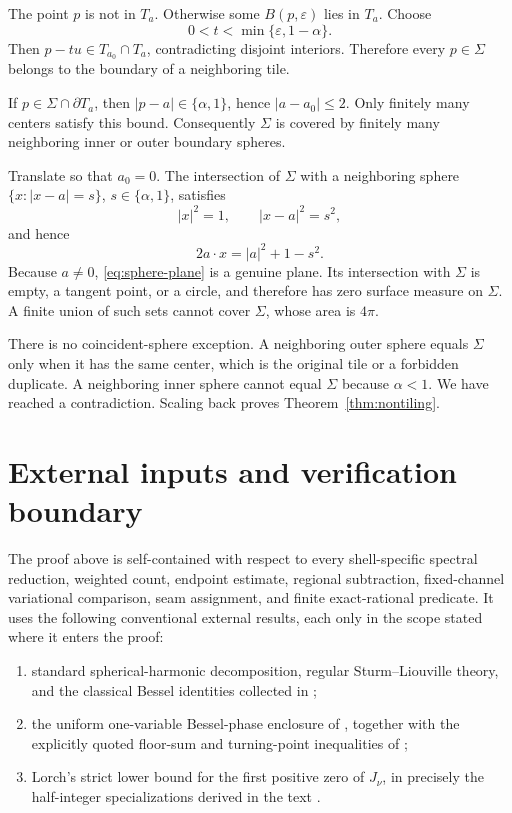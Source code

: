 \documentclass[11pt]{article}
\numberwithin{equation}{section}
\theoremstyle{definition}
\theoremstyle{remark}
\begin{document}
The point \(p\) is not in \(T_a\).  Otherwise some
\(B(p,\varepsilon)\) lies in \(T_a\).  Choose
\[
  0<t<\min\{\varepsilon,1-\alpha\}.
\]
Then \(p-tu\in T_{a_0}\cap T_a\), contradicting disjoint interiors.
Therefore every \(p\in\Sigma\) belongs to the boundary of a neighboring
tile.

If \(p\in\Sigma\cap\partial T_a\), then
\(|p-a|\in\{\alpha,1\}\), hence \(|a-a_0|\le2\).  Only finitely many
centers satisfy this bound.  Consequently \(\Sigma\) is covered by finitely
many neighboring inner or outer boundary spheres.

Translate so that \(a_0=0\).  The intersection of \(\Sigma\) with a
neighboring sphere \(\{x:|x-a|=s\}\), \(s\in\{\alpha,1\}\), satisfies
\[
  |x|^2=1,
  \qquad |x-a|^2=s^2,
\]
and hence
\begin{equation}
  2a\cdot x=|a|^2+1-s^2.
  \label{eq:sphere-plane}
\end{equation}
Because \(a\ne0\), \eqref{eq:sphere-plane} is a genuine plane.  Its
intersection with \(\Sigma\) is empty, a tangent point, or a circle, and
therefore has zero surface measure on \(\Sigma\).  A finite union of such
sets cannot cover \(\Sigma\), whose area is \(4\pi\).

There is no coincident-sphere exception.  A neighboring outer sphere equals
\(\Sigma\) only when it has the same center, which is the original tile or a
forbidden duplicate.  A neighboring inner sphere cannot equal \(\Sigma\)
because \(\alpha<1\).  We have reached a contradiction.  Scaling back proves
Theorem~\ref{thm:nontiling}.

\appendix

\section{External inputs and verification boundary}
\label{app:external-boundary}

The proof above is self-contained with respect to every shell-specific
spectral reduction, weighted count, endpoint estimate, regional subtraction,
fixed-channel variational comparison, seam assignment, and finite
exact-rational predicate.  It uses the following conventional external results, each only
in the scope stated where it enters the proof:
\begin{enumerate}
  \item standard spherical-harmonic decomposition, regular
        Sturm--Liouville theory, and the classical Bessel identities collected
        in \cite{DLMF};
  \item the uniform one-variable Bessel-phase enclosure of
        \cite{FLPSphase}, together with the explicitly quoted floor-sum and
        turning-point inequalities of \cite{FLPSballs,FLPSannuli};
  \item Lorch's strict lower bound for the first positive zero of
        \(J_\nu\), in precisely the half-integer specializations derived in
        the text \cite{Lorch1993}.
\end{enumerate}
\end{document}
